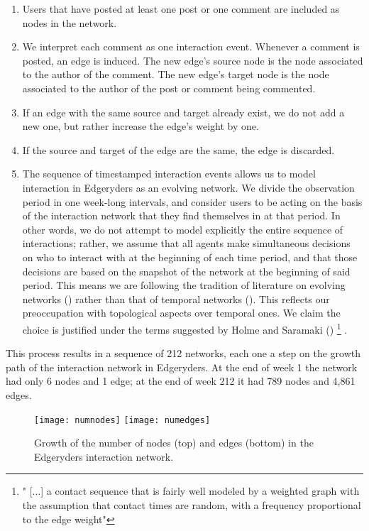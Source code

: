 \begin{enumerate}
	\item Users that have posted at least one post or one comment are included as nodes in the network.
	\item We interpret each comment as one interaction event. Whenever a comment is posted, an edge is induced. The new edge's source node is the node associated to the author of the comment. The new edge's target node is the node associated to the author of the post or comment being commented. 
	\item If an edge with the same source and target already exist, we do not add a new one, but rather increase the edge's weight by one.
	\item If the source and target of the edge are the same, the edge is discarded.  
	\item The sequence of timestamped interaction events allows us to model interaction in Edgeryders as an evolving network. We divide the observation period in one week-long intervals, and consider users to be acting on the basis of the interaction network that they find themselves in at that period. In other words, we do not attempt to model explicitly the entire sequence of interactions; rather, we assume that all agents make simultaneous decisions on who to interact with at the beginning of each time period, and that those decisions are based on the snapshot of the network at the beginning of said period. This means we are following the tradition of literature on evolving networks (\cite{dorogovtsev2002evolution}) rather than that of temporal networks (\cite{holme2012temporal}). This reflects our preoccupation with topological aspects over temporal ones. We claim the choice is justified under the terms suggested by Holme and Saramaki (\cite{holme2012temporal}) \footnote{" [...] a contact sequence that is fairly well modeled by a weighted graph with the assumption that contact times are random, with a frequency proportional to the edge weight"} .

\end{enumerate}

This process results in a sequence of 212 networks, each one a step on the growth path of the interaction network in Edgeryders. At the end of week 1 the network had only 6 nodes and 1 edge; at the end of week 212 it had 789 nodes and 4,861 edges.

\begin{figure}
	\texttt{[image: numnodes]}
	\texttt{[image: numedges]}
	\caption{Growth of the number of nodes (top) and edges (bottom) in the Edgeryders interaction network.}
\label{fig:growthNodesEdges}
\end{figure}


